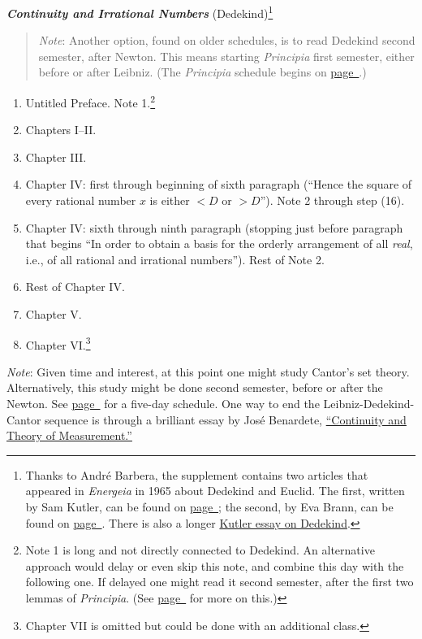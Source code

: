 \documentclass[10pt]{article}
\begin{document}
\textbf{\emph{Continuity and Irrational Numbers}} (Dedekind)\footnote{Thanks to Andr\'e Barbera, the supplement contains two articles that appeared in \emph{Energeia} in 1965 about Dedekind and Euclid. The first, written by Sam Kutler, can be found on \hyperref[supple.100]{page~\pageref{supple.100}}; the second, by Eva Brann, can be found on \hyperref[supple.102]{page~\pageref{supple.102}}. There is also a longer \href{https://drive.google.com/file/d/14ZP9-NtLSKE-jeJbgjqxgkxo7QWGJVR1/view?usp=sharing}{Kutler essay
on Dedekind}.}
\vspace{-0.2em}
\begin{quote}
\small{\emph{Note}: Another option, found on older schedules, is to read Dedekind second semester, after Newton. This means starting \emph{Principia} first semester, either before or after Leibniz. (The \emph{Principia} schedule begins on \hyperref[NewtonStart]{page~\pageref{NewtonStart}}.)

} 
\end{quote}
\begin{enumerate}[resume*]
	\item Untitled Preface. Note 1.\footnote{Note 1 is
			long and not directly connected to
		       Dedekind. An alternative approach
	       would delay or even skip this note, and
	       combine this day with the following one. If
       delayed one might read it second semester, after the
first two lemmas of \emph{Principia}. (See
\hyperref[Dedekind]{page~\pageref{Dedekind}} for more on
	this.)}	       
	\item Chapters I--II.
	\item Chapter III. 
	\item Chapter IV: first through beginning of sixth
		paragraph (``Hence the square of every
		rational number $x$ is either $<D$ or
		$>D$''). Note 2 through step (16).
	\item Chapter IV: sixth through ninth paragraph
		(stopping just before paragraph that begins
		``In order to obtain a basis for the orderly
		arrangement of all \emph{real}, i.e., of all
		rational and irrational numbers''). Rest of
	       Note 2.	
       \item Rest of Chapter IV.
       \item Chapter V.
       \item Chapter VI.\footnote{Chapter VII is omitted but
		       could be done with an additional
		       class.}
\end{enumerate}
{\small\emph{Note}: Given time and interest, at this point one
might study Cantor's set theory. Alternatively, this study
might be done second semester, before or after the Newton.
See \hyperref[Cantor]{page~\pageref{Cantor}} for a five-day 
schedule. One way to end the Leibniz-Dedekind-Cantor sequence
is through a brilliant essay by Jos\'e Benardete, \href{https://drive.google.com/file/d/14YTO3e3k-1osmcZWnsmN2aEGdqNfefOc/view?usp=sharing}{``Continuity and Theory of Measurement.''}

}
\end{document}
